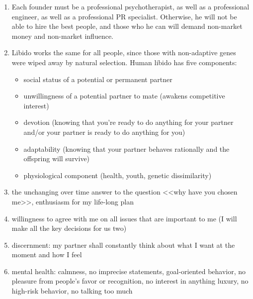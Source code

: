 \documentclass[11pt]{article}
\theoremstyle{remark}
\theoremstyle{definition}
\begin{document}
\begin{enumerate}


\item Each founder must be a professional psychotherapist, as well as a professional engineer, as well as a professional PR specialist. Otherwise, he will not be able to hire the best people, and those who he can will demand non-market money and non-market influence.

\item Libido works the same for all people, since those with non-adaptive genes were wiped away by natural selection. Human libido has five components:

\begin{itemize}

\item social status of a potential or permanent partner

\item unwillingness of a potential partner to mate (awakens competitive interest) 

\item devotion (knowing that you're ready to do anything for your partner and/or your partner is ready to do anything for you)

\item adaptability (knowing that your partner behaves rationally and the offspring will survive)

\item physiological component (health, youth, genetic dissimilarity)

\end{itemize}

\item the unchanging over time answer to the question <<why have you chosen me>>, enthusiasm for my life-long plan 

\item willingness to agree with me on all issues that are important to me (I will make all the key decisions for us two)

\item discernment: my partner shall constantly think about what I want at the moment and how I feel

\item mental health: calmness, no imprecise statements, goal-oriented behavior, no pleasure from people's favor or recognition, no interest in anything luxury, no high-risk behavior, no talking too much


\end{enumerate}
\end{document}
